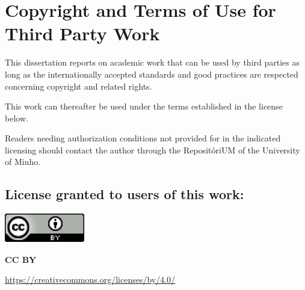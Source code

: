\chapter*{Copyright and Terms of Use for Third Party Work}
\setlength{\parskip}{1em}
\noindent
This dissertation reports on academic work that can be used by third parties as long as the internationally accepted standards and good practices are respected concerning copyright and related rights.

\noindent
This work can thereafter be used under the terms established in the license below.

\noindent
Readers needing authorization conditions not provided for in the indicated licensing should contact the author through the RepositóriUM of the University of Minho.

\section*{License granted to users of this work:}

\noindent
\includegraphics[]{images/CCBY.png}
\par
\textbf{CC BY}
\par
\url{https://creativecommons.org/licenses/by/4.0/}

\setlength{\parskip}{0em}

